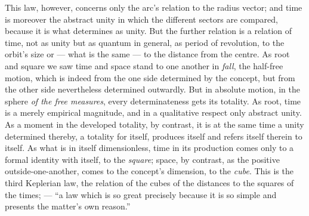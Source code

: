 \documentclass[12pt,a4paper]{book}
\begin{document}
This law, however, concerns only the arc's relation to the radius vector; and time is moreover the abstract
unity in which the different sectors are compared, because it is what determines as unity. But the further
relation is a relation of time, not as unity but as quantum in general, as period of revolution, to the
orbit's size or --- what is the same --- to the distance from the centre. As root and square we saw time and
space stand to one another in \emph{fall}, the half-free motion, which is indeed from the one side determined
by the concept, but from the other side nevertheless determined outwardly. But in absolute motion, in the
sphere \emph{of the free measures}, every determinateness gets its totality. As root, time is a merely
empirical magnitude, and in a qualitative respect only abstract unity. As a moment in the developed totality,
by contrast, it is at the same time a unity determined thereby, a totality for itself, produces itself and
refers itself therein to itself. As what is in itself dimensionless, time in its production comes only to a
formal identity with itself, to the \emph{square}; space, by contrast, as the positive outside-one-another,
comes to the concept's dimension, to the \emph{cube}. This is the third Keplerian law, the relation of the
cubes of the distances to the squares of the times; --- ``a law which is so great precisely because it is so
simple and presents the matter's own reason.''
\end{document}
